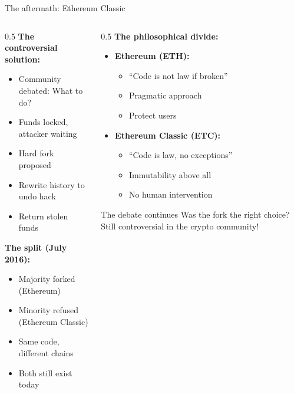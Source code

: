 \ifdefined\PRESENTATION\else\PassOptionsToClass{handout}{beamer}\fi\documentclass[aspectratio=169, lualatex]{beamer}
\begin{document}
\begin{frame}{The aftermath: Ethereum Classic}
	\begin{columns}[c]
		\begin{column}{0.5\textwidth}
			\textbf{The controversial solution:}
			\begin{itemize}
				\item Community debated: What to do?
				\item Funds locked, attacker waiting
				\item Hard fork proposed
				\item Rewrite history to undo hack
				\item Return stolen funds
			\end{itemize}
			\textbf{The split (July 2016):}
			\begin{itemize}
				\item Majority forked (Ethereum)
				\item Minority refused (Ethereum Classic)
				\item Same code, different chains
				\item Both still exist today
			\end{itemize}
		\end{column}
		\begin{column}{0.5\textwidth}
			\textbf{The philosophical divide:}
			\begin{itemize}
				\item \textbf{Ethereum (ETH):}
				      \begin{itemize}
					      \item ``Code is not law if broken''
					      \item Pragmatic approach
					      \item Protect users
				      \end{itemize}
				\item \textbf{Ethereum Classic (ETC):}
				      \begin{itemize}
					      \item ``Code is law, no exceptions''
					      \item Immutability above all
					      \item No human intervention
				      \end{itemize}
			\end{itemize}
			\begin{alertblock}{The debate continues}
				Was the fork the right choice? Still controversial in the crypto community!
			\end{alertblock}
		\end{column}
	\end{columns}
\end{frame}
\end{document}

